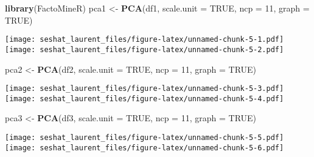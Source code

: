 \documentclass[
]{article}
\newenvironment{Shaded}{\begin{snugshade}}{\end{snugshade}}
\newcommand{\DataTypeTok}[1]{\textcolor[rgb]{0.13,0.29,0.53}{#1}}
\newcommand{\DecValTok}[1]{\textcolor[rgb]{0.00,0.00,0.81}{#1}}
\newcommand{\KeywordTok}[1]{\textcolor[rgb]{0.13,0.29,0.53}{\textbf{#1}}}
\newcommand{\NormalTok}[1]{#1}
\newcommand{\OperatorTok}[1]{\textcolor[rgb]{0.81,0.36,0.00}{\textbf{#1}}}
\newcommand{\OtherTok}[1]{\textcolor[rgb]{0.56,0.35,0.01}{#1}}
\newcommand{\StringTok}[1]{\textcolor[rgb]{0.31,0.60,0.02}{#1}}
\begin{document}
\begin{Shaded}
\begin{Highlighting}[]
\KeywordTok{library}\NormalTok{(FactoMineR)}
\NormalTok{pca1 <-}\StringTok{ }\KeywordTok{PCA}\NormalTok{(df1, }\DataTypeTok{scale.unit =} \OtherTok{TRUE}\NormalTok{, }\DataTypeTok{ncp =} \DecValTok{11}\NormalTok{, }\DataTypeTok{graph =} \OtherTok{TRUE}\NormalTok{)}
\end{Highlighting}
\end{Shaded}

\texttt{[image: seshat\_laurent\_files/figure-latex/unnamed-chunk-5-1.pdf]}
\texttt{[image: seshat\_laurent\_files/figure-latex/unnamed-chunk-5-2.pdf]}

\begin{Shaded}
\begin{Highlighting}[]
\NormalTok{pca2 <-}\StringTok{ }\KeywordTok{PCA}\NormalTok{(df2, }\DataTypeTok{scale.unit =} \OtherTok{TRUE}\NormalTok{, }\DataTypeTok{ncp =} \DecValTok{11}\NormalTok{, }\DataTypeTok{graph =} \OtherTok{TRUE}\NormalTok{)}
\end{Highlighting}
\end{Shaded}

\texttt{[image: seshat\_laurent\_files/figure-latex/unnamed-chunk-5-3.pdf]}
\texttt{[image: seshat\_laurent\_files/figure-latex/unnamed-chunk-5-4.pdf]}

\begin{Shaded}
\begin{Highlighting}[]
\NormalTok{pca3 <-}\StringTok{ }\KeywordTok{PCA}\NormalTok{(df3, }\DataTypeTok{scale.unit =} \OtherTok{TRUE}\NormalTok{, }\DataTypeTok{ncp =} \DecValTok{11}\NormalTok{, }\DataTypeTok{graph =} \OtherTok{TRUE}\NormalTok{)}
\end{Highlighting}
\end{Shaded}

\texttt{[image: seshat\_laurent\_files/figure-latex/unnamed-chunk-5-5.pdf]}
\texttt{[image: seshat\_laurent\_files/figure-latex/unnamed-chunk-5-6.pdf]}

\begin{Shaded}
\end{Shaded}
\end{document}

